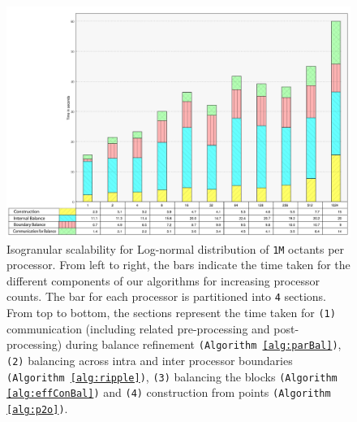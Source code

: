 \begin{figure}
  \begin{center}
    \includegraphics[width=\textwidth]{images/isoLN}
  \end{center}
  \caption{Isogranular scalability for Log-normal distribution of
  {\tt1M} octants per processor. From left to right, the bars indicate
  the time taken for the different components of our algorithms for
  increasing processor counts. The bar for each processor is
  partitioned into {\tt4} sections. From top to bottom, the sections
  represent the time taken for {\tt(1)} communication (including
  related pre-processing and post-processing) during balance
  refinement {\tt(Algorithm \ref{alg:parBal})}, {\tt(2)} balancing
  across intra and inter processor boundaries {\tt(Algorithm
  \ref{alg:ripple})}, {\tt(3)} balancing the blocks {\tt(Algorithm
  \ref{alg:effConBal})} and {\tt(4)} construction from points
  {\tt(Algorithm \ref{alg:p2o})}.}
  \label{fig:isoLN}
\end{figure}

